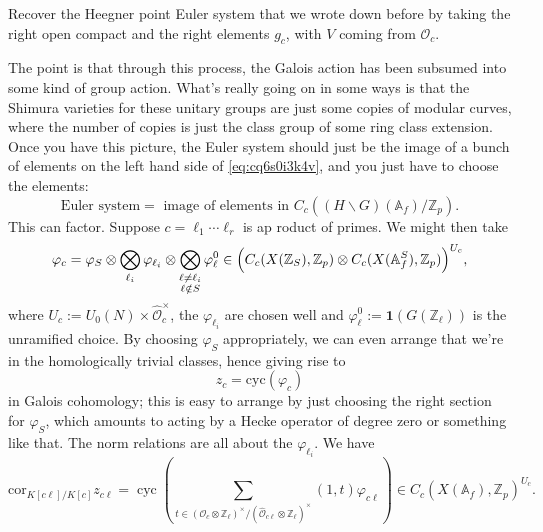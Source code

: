 \documentclass[reqno]{amsart} 
\begin{document}
\begin{exercise}\label{exercise:cq6tho7823}
  Recover the Heegner point Euler system that we wrote down before by taking the right open compact and the right elements $g_c$, with $V$ coming from $\mathcal{O}_c$.
\end{exercise}
The point is that through this process, the Galois action has been subsumed into some kind of group action.  What's really going on in some ways is that the Shimura varieties for these unitary groups are just some copies of modular curves, where the number of copies is just the class group of some ring class extension.  Once you have this picture, the Euler system should just be the image of a bunch of elements on the left hand side of \eqref{eq:cq6s0i3k4v}, and you just have to choose the elements:
\begin{equation*}
  \text{Euler system} = \text{ image of elements in } C_c((H \backslash G)(\mathbb{A}_f) / \mathbb{Z}_p).
\end{equation*}
This can factor.  Suppose $c = \ell_1 \dotsb \ell_r$ is ap roduct of primes.  We might then take
\begin{equation*}
  \varphi_c = \varphi_S \otimes \bigotimes_{\ell_i} \varphi_{\ell_i} \otimes \bigotimes_{
    \substack{
      \ell \neq \ell_i  \\
      \ell \notin S      
    }
  }
  \varphi_{\ell}^0 \in \Bigl(C_c(X(\mathbb{Z}_S), \mathbb{Z}_p) \otimes C_c(X(\mathbb{A}_f^S), \mathbb{Z}_p)\Bigr)^{U_c},
\end{equation*}
where $U_c := U_0(N) \times \hat{\mathcal{O}}_c^\times$, the $\varphi_{\ell_i}$ are chosen well and $\varphi_{\ell}^0 := \mathbf{1}(G(\mathbb{Z}_{\ell}))$ is the unramified choice.  By choosing $\varphi_S$ appropriately, we can even arrange that we're in the homologically trivial classes, hence giving rise to
\begin{equation*}
  z_c = \mathrm{cyc}(\varphi_c)
\end{equation*}
in Galois cohomology; this is easy to arrange by just choosing the right section for $\varphi_S$, which amounts to acting by a Hecke operator of degree zero or something like that.  The norm relations are all about the $\varphi_{\ell_i}$.  We have
\begin{equation*}
  \mathrm{cor}_{K[c \ell] / K[c]} z_{c \ell} =
  \operatorname{cyc}
  \left(
    \sum_{
      t \in (\mathcal{O}_c \otimes \mathbb{Z}_{\ell} )^\times /(\hat{\mathcal{O}}_{c \ell} \otimes \mathbb{Z}_{\ell})^\times
    }
    (1, t) \varphi_{c \ell}
  \right)
  \in C_c(X(\mathbb{A}_f), \mathbb{Z}_p)^{U_c}.
\end{equation*}
\end{document}
